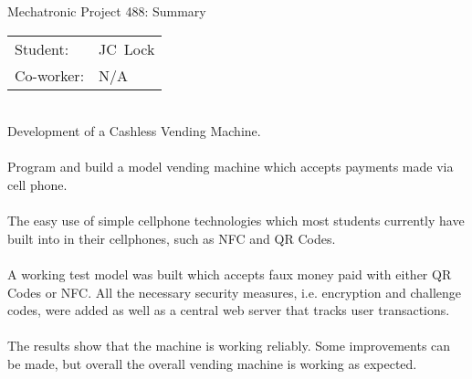 
\begin{Summary}{Mechatronic Project 488: Summary}

   \noindent
   \begin{tabular}{@{}ll@{}}
      \textsf{Student:}  &  JC\ Lock\\
      \textsf{Co-worker:} & N/A
   \end{tabular}

\begin{SumTable}
 \hline%
 \\
 \hline%
 Development of a Cashless Vending Machine.
 \\

 \hline%
 \\
 \hline%
 Program and build a model vending machine which accepts payments made via cell phone.
 \\

 \hline%
 \\
 \hline%
 The easy use of simple cellphone technologies which most students currently have built
 into in their cellphones, such as NFC and QR Codes.
 \\
   
 \hline%
 \\
 \hline%
 A working test model was built which accepts faux money paid with either QR Codes or NFC. All
 the necessary security measures, i.e. encryption and challenge codes, were added as well as a
 central web server that tracks user transactions.
 \\

 \hline%
 \\
 \hline%
 The results show that the machine is working reliably. Some improvements can be made, but
 overall the overall vending machine is working as expected.
 \\


\end{SumTable}
\end{Summary}
